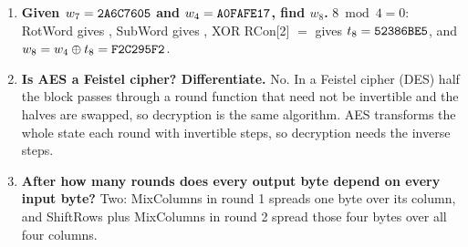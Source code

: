 \begin{enumerate}[leftmargin=1.5em,itemsep=2pt]
  \item \textbf{Given $w_7 = \texttt{2A6C7605}$ and $w_4 = \texttt{A0FAFE17}$, find $w_8$.} $8 \bmod 4 = 0$: RotWord gives , SubWord gives , XOR RCon[2] $=$  gives $t_8 = \texttt{52386BE5}$, and $w_8 = w_4 \oplus t_8 = \texttt{F2C295F2}$.
  \item \textbf{Is AES a Feistel cipher? Differentiate.} No. In a Feistel cipher (DES) half the block passes through a round function that need not be invertible and the halves are swapped, so decryption is the same algorithm. AES transforms the whole state each round with invertible steps, so decryption needs the inverse steps.
  \item \textbf{After how many rounds does every output byte depend on every input byte?} Two: MixColumns in round 1 spreads one byte over its column, and ShiftRows plus MixColumns in round 2 spread those four bytes over all four columns.
\end{enumerate}
